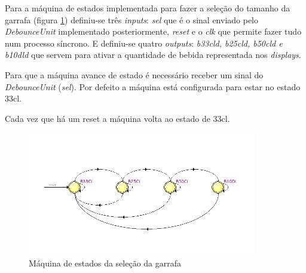 \documentclass{report}
\begin{document}
Para a máquina de estados implementada para fazer a seleção do tamanho da garrafa (figura \ref{fig:SelFSM}) definiu-se três \textit{inputs}: \textit{sel} que é o sinal enviado pelo \textit{DebounceUnit} implementado posteriormente, \textit{reset} e o \textit{clk} que permite fazer tudo num processo síncrono. E definiu-se quatro \textit{outputs}: \textit{b33cl\textunderscore d, b25cl\textunderscore d, b50cl\textunderscore d e b10dl\textunderscore d} que servem para ativar a quantidade de bebida representada nos \textit{displays}.

Para que a máquina avance de estado é necessário receber um sinal do \textit{DebounceUnit} (\textit{sel}). Por defeito a máquina está configurada para estar no estado 33cl.

Cada vez que há um reset a máquina volta ao estado de 33cl.

\begin{figure}[H]
    \centering
    \includegraphics[width = 10cm]{FSMSel.png}
    \caption{Máquina de estados da seleção da garrafa}
    \label{fig:SelFSM}
\end{figure}
\end{document}
